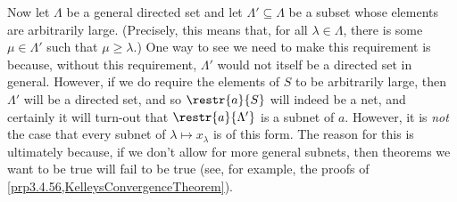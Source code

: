 Now let $\Lambda$ be a general directed set and let $\Lambda '\subseteq \Lambda$ be a subset whose elements are arbitrarily large.  (Precisely, this means that, for all $\lambda \in \Lambda$, there is some $\mu \in \Lambda '$ such that $\mu \geq \lambda$.)  One way to see we need to make this requirement is because, without this requirement, $\Lambda '$ would not itself be a directed set in general.  However, if we do require the elements of $S$ to be arbitrarily large, then $\Lambda '$ will be a directed set, and so $\restr{a}{S}$ will indeed be a net, and certainly it will turn-out that $\restr{a}{\Lambda '}$ is a subnet of $a$.  However, it is \emph{not} the case that every subnet of $\lambda \mapsto x_\lambda$ is of this form.  The reason for this is ultimately because, if we don't allow for more general subnets, then theorems we want to be true will fail to be true (see, for example, the proofs of \cref{prp3.4.56,KelleysConvergenceTheorem}).
